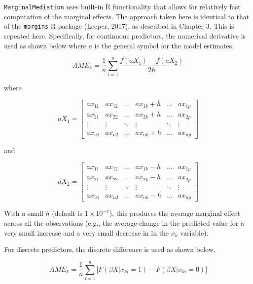 \documentclass[]{DissertateUSU}
\begin{document}
\texttt{MarginalMediation} uses built-in R functionality that allows for
relatively fast computation of the marginal effects. The approach taken
here is identical to that of the \texttt{margins} R package (Leeper,
2017), as described in Chapter 3. This is repeated here. Specifically,
for continuous predictors, the numerical derivative is used as shown
below where \(a\) is the general symbol for the model estimates.

\begin{equation}
AME_k = \frac{1}{n} \sum_{i = 1}^n \frac{f(aX_1) - f(aX_2)}{2h}
\end{equation}

\noindent where

\begin{equation}
aX_1 = \begin{bmatrix}
ax_{11} & ax_{12} & \dots & ax_{1k} + h & \dots & ax_{1p} \\
ax_{21} & ax_{22} & \dots & ax_{2k} + h & \dots & ax_{2p} \\
\vdots  & \vdots  & \ddots & \vdots     & \ddots  & \vdots \\
ax_{n1} & ax_{n2} & \dots & ax_{nk} + h & \dots & ax_{np}
\end{bmatrix}
\end{equation}

\noindent and

\begin{equation}
aX_2 = \begin{bmatrix}
ax_{11} & ax_{12} & \dots & ax_{1k} - h & \dots & ax_{1p} \\
ax_{21} & ax_{22} & \dots & ax_{2k} - h & \dots & ax_{2p} \\
\vdots  & \vdots  & \ddots & \vdots     & \ddots  & \vdots \\
ax_{n1} & ax_{n2} & \dots & ax_{nk} - h & \dots & ax_{np}
\end{bmatrix}
\end{equation}

\noindent With a small \(h\) (default is \(1 \times 10^{-7}\)), this
produces the average marginal effect across all the observations (e.g.,
the average change in the predicted value for a very small increase and
a very small decrease in in the \(x_k\) variable).

For discrete predictors, the discrete difference is used as shown below,

\begin{equation}
AME_{k} = \frac{1}{n} \sum_{i=1}^{n} \big[ F(\beta X | x_{ki} = 1) - F(\beta X | x_{ki} = 0) \big]
\end{equation}
\end{document}
